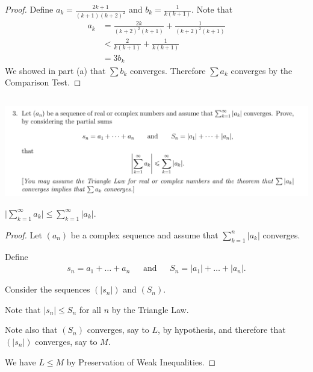 \documentclass[12pt]{article}
\begin{document}
\begin{proof}
  Define $a_k = \frac{2k + 1}{(k + 1)(k + 2)^2}$ and $b_k = \frac{1}{k(k + 1)}$. Note that
  \begin{align*}
    a_k
    &= \frac{2k}{(k + 2)^2(k + 1)} + \frac{1}{(k + 2)^2(k + 1)}\\
    &< \frac{2}{k(k + 1)} + \frac{1}{k(k + 1)}\\
    &= 3b_k
  \end{align*}
  We showed in part (a) that $\sum b_k$ converges. Therefore $\sum a_k$ converges by the Comparison Test.
\end{proof}

\newpage
\subsection{}
\begin{mdframed}
\includegraphics[width=400pt]{img/analysis--oxford-M2-I-5-3.png}
\end{mdframed}
\begin{claim*}
  $\Big|\sum\limits_{k=1}^\infty a_k\Big| \leq \sum\limits_{k=1}^\infty |a_k|$.
\end{claim*}

\begin{proof}
  Let $(a_n)$ be a complex sequence and assume that $\sum_{k=1}^n |a_k|$ converges.

  Define
  \begin{align*}
    s_n = a_1 + \ldots + a_n ~~~~~~~\text{and}~~~~~~~ S_n = |a_1| + \ldots + |a_n|.
  \end{align*}

  Consider the sequences $(|s_n|)$ and $(S_n)$.

  Note that $|s_n| \leq S_n$ for all $n$ by the Triangle Law.

  Note also that $(S_n)$ converges, say to $L$, by hypothesis, and therefore that $(|s_n|)$
  converges, say to $M$.

  We have $L \leq M$ by Preservation of Weak Inequalities.
\end{proof}
\end{document}
